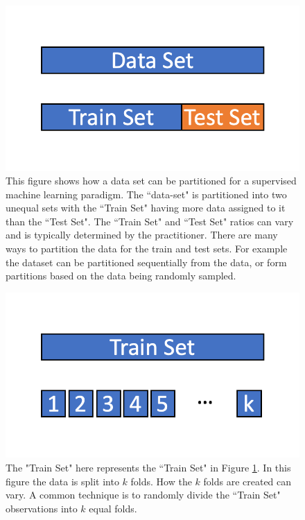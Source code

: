 \begin{figure}[!htb]
    \centering
      \centering
      \includegraphics[width=\textwidth]{figures/ppt/TrainTestSplit.png}
    \caption{
      This figure shows how a data set can be partitioned for a supervised machine learning paradigm. The ``data-set" is partitioned into two unequal sets with the ``Train Set" having more data assigned to it than the ``Test Set".  The ``Train Set" and ``Test Set" ratios can vary and is typically determined by the practitioner. There are many ways to partition the data for the train and test sets. For example the dataset can be partitioned sequentially from the data, or form partitions based on the data being randomly sampled.
      }
\label{fig:TrainTestSplit}

  \end{figure}


\begin{figure}[!htb]
    \centering
      \centering
      \includegraphics[width=\textwidth]{figures/ppt/KFoldValidation.png}
    \caption{
	The "Train Set" here represents the ``Train Set" in Figure \ref{fig:TrainTestSplit}. In this figure the data is split into \(k\) folds. How the \(k\) folds are created can vary. A common technique is to randomly divide the ``Train Set" observations into \(k\) equal folds.
      }
     \label{fig:KFoldValidation}
  \end{figure}

